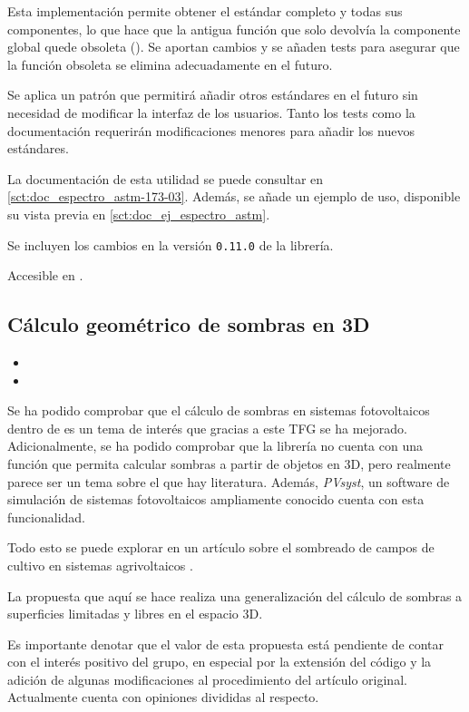 Esta implementación permite obtener el \gls{estándar} completo y todas sus componentes, lo que hace que la antigua función que solo devolvía la componente global quede obsoleta (). Se aportan cambios y se añaden tests para asegurar que la función obsoleta se elimina adecuadamente en el futuro.

Se aplica un patrón que permitirá añadir otros estándares en el futuro sin necesidad de modificar la interfaz de los usuarios. Tanto los tests como la documentación requerirán modificaciones menores para añadir los nuevos estándares.

La documentación de esta utilidad se puede consultar en \ref{sct:doc_espectro_astm-173-03}. Además, se añade un ejemplo de uso, disponible su vista previa en \ref{sct:doc_ej_espectro_astm}.

Se incluyen los cambios en la versión \texttt{0.11.0} de la librería.

Accesible en .

\subsection{Cálculo geométrico de sombras en 3D}

\begin{itemize}
    \item {}
    \item {}
\end{itemize}

Se ha podido comprobar que el cálculo de sombras en sistemas fotovoltaicos dentro de \pvlibpy{} es un tema de interés que gracias a este TFG se ha mejorado. Adicionalmente, se ha podido comprobar que la librería no cuenta con una función que permita calcular sombras a partir de objetos en 3D, pero realmente parece ser un tema sobre el que hay literatura. Además, \textit{PVsyst}, un \gls{software} de simulación de sistemas fotovoltaicos ampliamente conocido cuenta con esta funcionalidad.

Todo esto se puede explorar en un artículo sobre el sombreado de campos de cultivo en sistemas agrivoltaicos \cite{Zainali_Ma_Lu_Stridh_Avelin_Amaducci_Colauzzi_Campana_2023}.

La propuesta que aquí se hace realiza una generalización del cálculo de sombras a superficies limitadas y libres en el espacio 3D.

Es importante denotar que el valor de esta propuesta está pendiente de contar con el interés positivo del grupo, en especial por la extensión del código y la adición de algunas modificaciones al procedimiento del artículo original. Actualmente cuenta con opiniones divididas al respecto.

